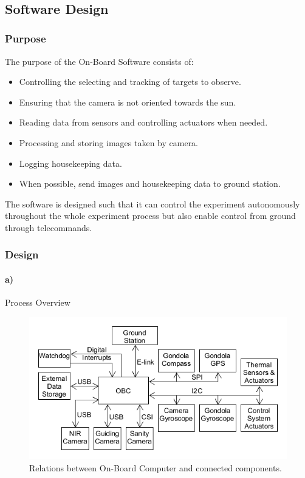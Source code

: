 $  $\pagebreak
\subsection{Software Design}

\subsubsection{Purpose}

The purpose of the On-Board Software consists of:
\begin{itemize}
	\item Controlling the selecting and tracking of targets to observe.
	\item Ensuring that the camera is not oriented towards the sun.
	\item Reading data from sensors and controlling actuators when needed.
	\item Processing and storing images taken by camera.
	\item Logging housekeeping data.
	\item When possible, send images and housekeeping data to ground station.
\end{itemize}

The software is designed such that it can control the experiment autonomously throughout the whole experiment process but also enable control from ground through telecommands.

\subsubsection{Design}

\paragraph{a)} Process Overview

\begin{figure}[H]
	\centering
	\includegraphics[width=\textwidth]{4-experiment-design/img/software/process-overview.png}
	\caption{Relations between On-Board Computer and connected components.}
	\label{fig:software-process-overview}
\end{figure}

